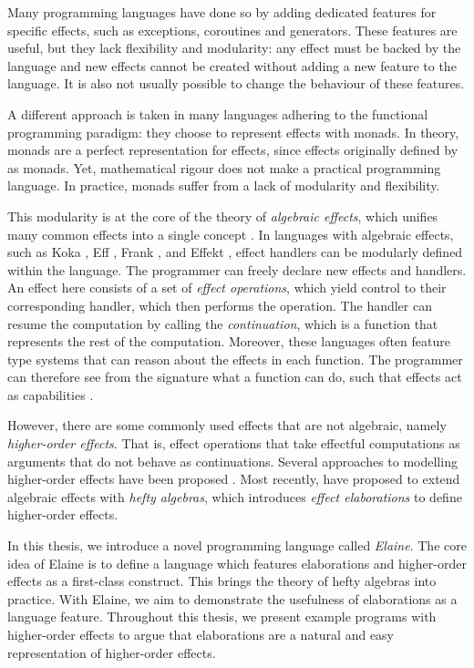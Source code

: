 Many programming languages have done so by adding dedicated features for specific effects, such as exceptions, coroutines and generators. These features are useful, but they lack flexibility and modularity: any effect must be backed by the language and new effects cannot be created without adding a new feature to the language. It is also not usually possible to change the behaviour of these features.

A different approach is taken in many languages adhering to the functional programming paradigm: they choose to represent effects with monads. In theory, monads are a perfect representation for effects, since effects originally defined by \textcite{moggi_notions_1991} as monads. Yet, mathematical rigour does not make a practical programming language. In practice, monads suffer from a lack of modularity and flexibility.\citationneeded

This modularity is at the core of the theory of \emph{algebraic effects}, which unifies many common effects into a single concept \autocite{goos_adequacy_2001,castagna_handlers_2009}. In languages with algebraic effects, such as Koka \autocite{leijen_koka_2014}, Eff \autocite{bauer_programming_2015}, Frank \autocite{lindley_be_2017}, and Effekt \autocite{brachthauser_effects_2020}, effect handlers can be modularly defined within the language. The programmer can freely declare new effects and handlers. An effect here consists of a set of \emph{effect operations}, which yield control to their corresponding handler, which then performs the operation. The handler can resume the computation by calling the \emph{continuation}, which is a function that represents the rest of the computation. Moreover, these languages often feature type systems that can reason about the effects in each function. The programmer can therefore see from the signature what a function can do, such that effects act as capabilities \autocite{brachthauser_effects_2020}.

However, there are some commonly used effects that are not algebraic, namely \emph{higher-order effects}. That is, effect operations that take effectful computations as arguments that do not behave as continuations. Several approaches to modelling higher-order effects have been proposed \autocite{wu_effect_2014,oh_latent_2021}. Most recently, \textcite{bach_poulsen_hefty_2023} have proposed to extend algebraic effects with \emph{hefty algebras}, which introduces \emph{effect elaborations} to define higher-order effects. 

In this thesis, we introduce a novel programming language called \emph{Elaine}. The core idea of Elaine is to define a language which features elaborations and higher-order effects as a first-class construct. This brings the theory of hefty algebras into practice. With Elaine, we aim to demonstrate the usefulness of elaborations as a language feature. Throughout this thesis, we present example programs with higher-order effects to argue that elaborations are a natural and easy representation of higher-order effects.

